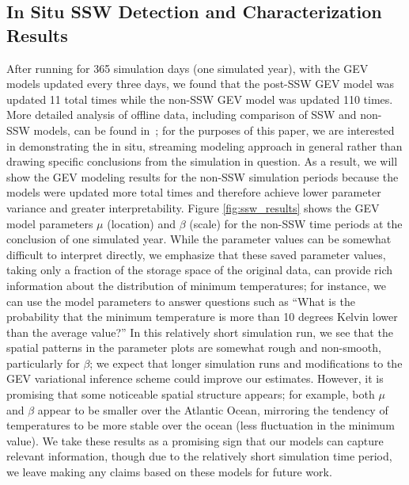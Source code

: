 \documentclass{juliacon}
\begin{document}
\subsection{In Situ SSW Detection and Characterization Results}
After running for 365 simulation days (one simulated year), with the GEV models updated every three days, we found that the post-SSW GEV model was updated 11 total times while the non-SSW GEV model was updated 110 times.
More detailed analysis of offline data, including comparison of SSW and non-SSW models, can be found in~\cite{ssw_isav}; for the purposes of this paper, we are interested in demonstrating the in situ, streaming modeling approach in general rather than drawing specific conclusions from the simulation in question. As a result, we will show the GEV modeling results for the non-SSW simulation periods because the models were updated more total times and therefore achieve lower parameter variance and greater interpretability.
Figure \ref{fig:ssw_results} shows the GEV model parameters $\mu$ (location) and $\beta$ (scale) for the non-SSW time periods at the conclusion of one simulated year. 
While the parameter values can be somewhat difficult to interpret directly, we emphasize that these saved parameter values, taking only a fraction of the storage space of the original data, can provide rich information about the distribution of minimum temperatures; for instance, we can use the model parameters to answer questions such as ``What is the probability that the minimum temperature is more than 10 degrees Kelvin lower than the average value?''
In this relatively short simulation run, we see that the spatial patterns in the parameter plots are somewhat rough and non-smooth, particularly for $\beta$; we expect that longer simulation runs and modifications to the GEV variational inference scheme could improve our estimates. 
However, it is promising that some noticeable spatial structure appears; for example, both $\mu$ and $\beta$ appear to be smaller over the Atlantic Ocean, mirroring the tendency of temperatures to be more stable over the ocean (less fluctuation in the minimum value). 
We take these results as a promising sign that our models can capture relevant information, though due to the relatively short simulation time period, we leave making any claims based on these models for future work.
\end{document}
